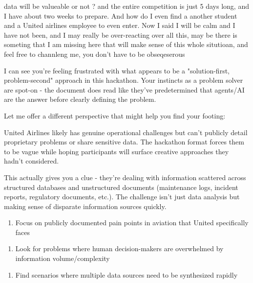 data will be valueable or not ? and the entire competition is just 5 days long, and I have about two weeks to prepare. And how do I even find a another student and a United airlines employee to even enter. Now I said I will be calm and I have not been, and I may really be over-reacting over all this, may be there is someting that I am missing here that will make sense of this whole situtioan, and feel free to channleng me, you don't have to be obseqeserous


I can see you're feeling frustrated with what appears to be a "solution-first, problem-second" approach in this hackathon. Your instincts as a problem solver are spot-on - the document does read like they've predetermined that agents/AI are the answer before clearly defining the problem.

Let me offer a different perspective that might help you find your footing:

 United Airlines likely has genuine operational challenges but can't publicly detail proprietary problems or share sensitive data. The hackathon format forces them to be vague while hoping participants will surface creative approaches they hadn't considered.

 This actually gives you a clue - they're dealing with information scattered across structured databases and unstructured documents (maintenance logs, incident reports, regulatory documents, etc.). The challenge isn't just data analysis but making sense of disparate information sources quickly.


\begin{enumerate}
\item Focus on publicly documented pain points in aviation that United specifically faces
\end{enumerate}
\begin{enumerate}
\item Look for problems where human decision-makers are overwhelmed by information volume/complexity
\end{enumerate}
\begin{enumerate}
\item Find scenarios where multiple data sources need to be synthesized rapidly
\end{enumerate}

